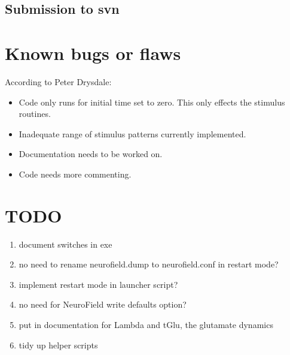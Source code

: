 \documentclass[12pt,a4paper]{article}
\begin{document}
\subsection{Submission to svn}

\section{Known bugs or flaws}
According to Peter Drysdale:
\begin{itemize}
\item Code only runs for initial time set to zero. This only effects the stimulus routines.
\item Inadequate range of stimulus patterns currently implemented.
\item Documentation needs to be worked on.
\item Code needs more commenting.
\end{itemize}

\section{TODO}
\begin{enumerate}
\item document switches in exe
\item no need to rename neurofield.dump to neurofield.conf in restart mode?
\item implement restart mode in launcher script?
\item no need for NeuroField write defaults option?
\item put in documentation for Lambda and tGlu, the glutamate dynamics
\item tidy up helper scripts
\end{enumerate}
\end{document}
